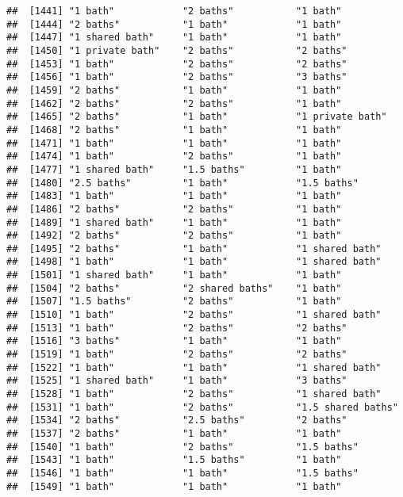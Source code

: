\documentclass[
]{article}
\begin{document}
\begin{verbatim}
##  [1441] "1 bath"            "2 baths"           "1 bath"           
##  [1444] "2 baths"           "1 bath"            "1 bath"           
##  [1447] "1 shared bath"     "1 bath"            "1 bath"           
##  [1450] "1 private bath"    "2 baths"           "2 baths"          
##  [1453] "1 bath"            "2 baths"           "2 baths"          
##  [1456] "1 bath"            "2 baths"           "3 baths"          
##  [1459] "2 baths"           "1 bath"            "1 bath"           
##  [1462] "2 baths"           "2 baths"           "1 bath"           
##  [1465] "2 baths"           "1 bath"            "1 private bath"   
##  [1468] "2 baths"           "1 bath"            "1 bath"           
##  [1471] "1 bath"            "1 bath"            "1 bath"           
##  [1474] "1 bath"            "2 baths"           "1 bath"           
##  [1477] "1 shared bath"     "1.5 baths"         "1 bath"           
##  [1480] "2.5 baths"         "1 bath"            "1.5 baths"        
##  [1483] "1 bath"            "1 bath"            "1 bath"           
##  [1486] "2 baths"           "2 baths"           "1 bath"           
##  [1489] "1 shared bath"     "1 bath"            "1 bath"           
##  [1492] "2 baths"           "2 baths"           "1 bath"           
##  [1495] "2 baths"           "1 bath"            "1 shared bath"    
##  [1498] "1 bath"            "1 bath"            "1 shared bath"    
##  [1501] "1 shared bath"     "1 bath"            "1 bath"           
##  [1504] "2 baths"           "2 shared baths"    "1 bath"           
##  [1507] "1.5 baths"         "2 baths"           "1 bath"           
##  [1510] "1 bath"            "2 baths"           "1 shared bath"    
##  [1513] "1 bath"            "2 baths"           "2 baths"          
##  [1516] "3 baths"           "1 bath"            "1 bath"           
##  [1519] "1 bath"            "2 baths"           "2 baths"          
##  [1522] "1 bath"            "1 bath"            "1 shared bath"    
##  [1525] "1 shared bath"     "1 bath"            "3 baths"          
##  [1528] "1 bath"            "2 baths"           "1 shared bath"    
##  [1531] "1 bath"            "2 baths"           "1.5 shared baths" 
##  [1534] "2 baths"           "2.5 baths"         "2 baths"          
##  [1537] "2 baths"           "1 bath"            "1 bath"           
##  [1540] "1 bath"            "2 baths"           "1.5 baths"        
##  [1543] "1 bath"            "1.5 baths"         "1 bath"           
##  [1546] "1 bath"            "1 bath"            "1.5 baths"        
##  [1549] "1 bath"            "1 bath"            "1 bath"           

\end{verbatim}
\end{document}
